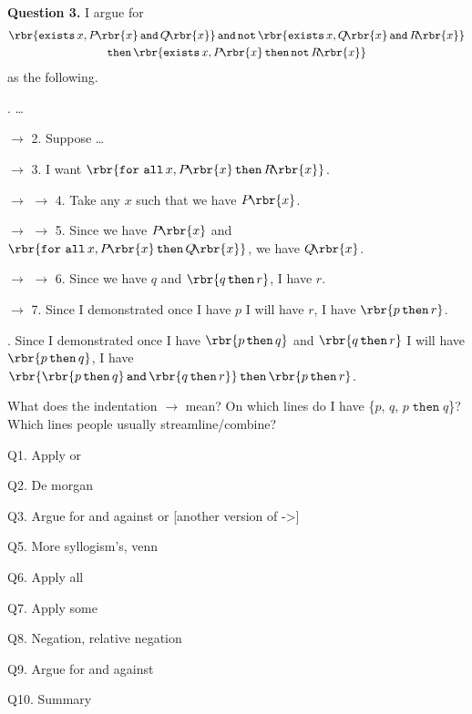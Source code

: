 \documentclass[12pt]{article}
\def\opthen{\mathop{\mathtt{then}}}
\def\opand{\mathop{\mathtt{and}}}
\def\opnot{\mathop{\mathtt{not}}}
\def\opforall{\mathop{\mathtt{for\ all}}}
\def\opexists{\mathop{\mathtt{exists}}}
\begin{document}
\hspace{-0.75in} \textbf{Question 3.} I argue for
\begin{multline*}
\rbr{ \opexists x, P\!\rbr{x} \opand Q\!\rbr{x} } \opand \opnot \rbr{ \opexists x, Q\!\rbr{x} \opand R\!\rbr{x} } \\
\opthen \rbr{ \opexists x, P\!\rbr{x} \opthen \opnot R\!\rbr{x} }
\end{multline*}
as the following.
\begin{mdframed}
. \ldots{}

\noindent $\longrightarrow$ 2. Suppose \ldots{}

\noindent $\longrightarrow$ 3. I want $ \rbr{ \opforall x, P\!\rbr{x} \opthen R\!\rbr{x} } $.

\noindent $\longrightarrow$ $\longrightarrow$ 4. Take any $x$ such that we have $ P\!\rbr{x} $.

\noindent $\longrightarrow$ $\longrightarrow$ 5. Since we have $ P\!\rbr{x} $ and $ \rbr{ \opforall x, P\!\rbr{x} \opthen Q\!\rbr{x} } $, we have $ Q\!\rbr{x} $.

\noindent $\longrightarrow$ $\longrightarrow$ 6. Since we have $q$ and $ \rbr{ q \opthen r } $, I have $r$.

\noindent $\longrightarrow$ 7. Since I demonstrated once I have $p$ I will have $r$, I have $ \rbr{ p \opthen r } $.

. Since I demonstrated once I have $ \rbr{ p \opthen q } $ and $ \rbr{ q \opthen r } $ I will have $ \rbr{ p \opthen q } $, I have $ \rbr{ \rbr{ p \opthen q } \opand \rbr{ q \opthen r } } \opthen \rbr{ p \opthen r } $.

\end{mdframed}
What does the indentation $\longrightarrow$ mean? On which lines do I have \{$p$, $q$, $ p \opthen q $\}? Which lines people usually streamline/combine?

\leavevmode




Q1. Apply or

Q2. De morgan

Q3. Argue for and against or [another version of ->]


Q5. More syllogism's, venn

Q6. Apply all

Q7. Apply some

Q8. Negation, relative negation

Q9. Argue for and against

Q10. Summary
\end{document}
